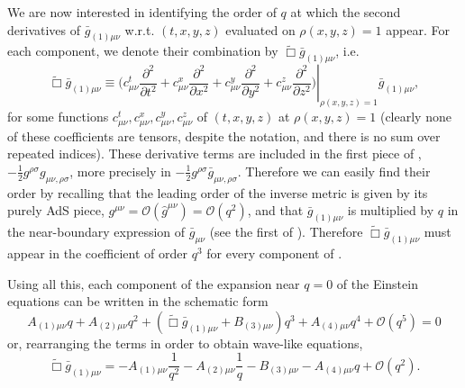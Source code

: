 \documentclass[12pt]{iopart} %
\begin{document}
We are now interested in identifying the order of $q$ at which the second derivatives of $ \bar{g}_{(1) \mu \nu}$ w.r.t. $(t,x,y,z)$ evaluated on $\rho(x,y,z)=1$ appear.
For each component, we denote their combination by $\tilde{\Box}\bar{g}_{(1)\mu\nu}$, i.e. 
\begin{equation}
\tilde{\Box}\bar{g}_{(1)\mu\nu}\equiv\left.\biggl(c^t_{\mu\nu}\frac{\partial^2}{\partial t^2}+c^x_{\mu\nu}\frac{\partial^2}{\partial x^2}+c^y_{\mu\nu}\frac{\partial^2}{\partial y^2}+c^z_{\mu\nu}\frac{\partial^2}{\partial z^2}\biggr)\right |_{\rho(x,y,z)=1}\bar{g}_{(1)\mu\nu},
\end{equation}
for some functions $c^t_{\mu\nu},c^x_{\mu\nu},c^y_{\mu\nu},c^z_{\mu\nu}$ of $(t,x,y,z)$ at $\rho(x,y,z)=1$ (clearly none of these coefficients are tensors, despite the notation, and there is no sum over repeated indices).
These derivative terms are included in the first piece of , $-\frac{1}{2}g^{\rho \sigma} g_{\mu \nu, \rho \sigma}$, more precisely in $-\frac{1}{2}g^{\rho \sigma} \bar{g}_{\mu \nu, \rho \sigma}$.
Therefore we can easily find their order by recalling that the leading order of the inverse metric is given by its purely AdS piece, $g^{\mu\nu}=\mathcal{O}(\hat{g}^{\mu\nu})=\mathcal{O}(q^{2})$, and that $\bar{g}_{(1)\mu\nu}$ is multiplied by $q$ in the near-boundary expression of $\bar{g}_{\mu\nu}$ (see the first of ). Therefore $\tilde{\Box}\bar{g}_{(1)\mu\nu}$ must appear in the coefficient of order $q^{3}$ for every component of .

Using all this, each component of the expansion near $q=0$ of the Einstein equations  can be written in the schematic form
\begin{equation}\label{eq:efefullexp}
A_{(1)\mu\nu}q+A_{(2)\mu\nu}q^2+(\tilde{\Box}\bar{g}_{(1)\mu\nu}+B_{(3)\mu\nu})q^3+A_{(4)\mu\nu}q^4+\mathcal{O}(q^5)=0
\end{equation}
or, rearranging the terms in order to obtain wave-like equations,
\begin{equation}
\tilde{\Box}\bar{g}_{(1)\mu\nu}=-A_{(1)\mu\nu}\frac{1}{q^2}-A_{(2)\mu\nu}\frac{1}{q}-B_{(3)\mu\nu}-A_{(4)\mu\nu}q+\mathcal{O}(q^2).
\end{equation}
\end{document}
